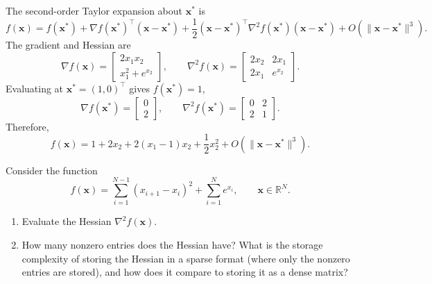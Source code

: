 \begin{solution}
    
    The second-order Taylor expansion about $\mathbf{x}^*$ is
    \[
        f(\mathbf{x}) = f(\mathbf{x}^*) + \nabla f(\mathbf{x}^*)^\top(\mathbf{x}-\mathbf{x}^*) + \frac{1}{2} (\mathbf{x}-\mathbf{x}^*)^\top \nabla^2 f(\mathbf{x}^*) (\mathbf{x}-\mathbf{x}^*) + O(\|\mathbf{x}-\mathbf{x}^*\|^3).
    \]
    The gradient and Hessian are
    \[
        \nabla f(\mathbf{x}) = \begin{bmatrix} 2x_1 x_2 \\ x_1^2 + e^{x_2} \end{bmatrix},
        \qquad
        \nabla^2 f(\mathbf{x}) = \begin{bmatrix} 2x_2 & 2x_1 \\ 2x_1 & e^{x_2} \end{bmatrix}.
    \]
    Evaluating at $\mathbf{x}^* = (1,0)^\top$ gives $f(\mathbf{x}^*) = 1$,
    \[
        \nabla f(\mathbf{x}^*) = \begin{bmatrix} 0 \\ 2 \end{bmatrix},
        \qquad
        \nabla^2 f(\mathbf{x}^*) = \begin{bmatrix} 0 & 2 \\ 2 & 1 \end{bmatrix}.
    \]
    Therefore,
    \[
        f(\mathbf{x}) = 1 + 2x_2 + 2(x_1 - 1)x_2 + \frac{1}{2} x_2^2 + O(\|\mathbf{x}-\mathbf{x}^*\|^3).
    \]
    
\end{solution}

\begin{exercise} %
    \label{ex:sparse-hessian}
    
    Consider the function
    \[
        f(\mathbf{x}) = \sum_{i=1}^{N-1} (x_{i+1} - x_i)^2 + \sum_{i=1}^{N} e^{x_i}, \qquad \mathbf{x} \in \mathbb{R}^N.
    \]
    \begin{enumerate}[label=(\alph*)]
        \item Evaluate the Hessian $\nabla^2 f(\mathbf{x})$.
        \item How many nonzero entries does the Hessian have? What is the storage complexity of storing the Hessian in a sparse format (where only the nonzero entries are stored), and how does it compare to storing it as a dense matrix?
    \end{enumerate}
    
\end{exercise}

